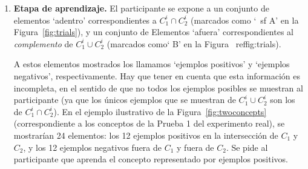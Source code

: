 \begin{enumerate}
    \item \label{item:LearningStage}{\bf Etapa de aprendizaje.} El participante se expone a un conjunto de elementos `adentro' correspondientes a $ C^i_1\cap C^i_2$ (marcados como `{\ sf A}' en la Figura~\ref{fig:trials}), y un conjunto de Elementos `afuera' correspondientes al {\em complemento} de $C^i_1\cup C^i_2$ (marcados como` {\sf B}' en la Figura~ ref{fig:trials}).

    
	A estos elementos mostrados los llamamos `ejemplos positivos' y `ejemplos negativos', respectivamente. Hay que tener en cuenta que esta información es incompleta, en el sentido de que no todos los ejemplos posibles se muestran al participante (ya que los únicos ejemplos que se muestran de $C^i_1 \cup C^i_2$ son los de $C^i_1 \cap C^i_2$). En el ejemplo ilustrativo de la Figura~\ref{fig:twoconcepts} (correspondiente a los conceptos de la Prueba 1 del experimento real), se mostrarían 24 elementos: los 12 ejemplos positivos en la intersección de $C_1$ y $C_2$, y los 12 ejemplos negativos fuera de $C_1$ y fuera de $C_2$. Se pide al participante que aprenda el concepto representado por ejemplos positivos.


\end{enumerate}
